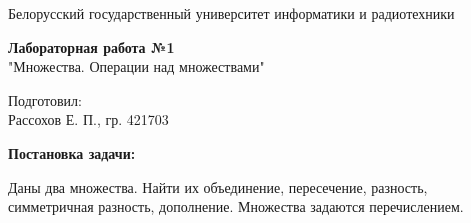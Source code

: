 \documentclass[]{article}
\begin{document}
	\begin{center}
		\par Белорусский государственный университет информатики и радиотехники
	\end{center}
	\vspace*{10cm}
	\begin{center}
		\huge
		\par \textbf{Лабораторная работа №1}\\
		\vspace{0.5cm}
		\normalsize 
		"Множества. Операции над множествами"
	\end{center}
	\vspace*{8cm}
	\begin{flushright}
		\large
		Подготовил:\\
		Рассохов Е. П., гр. 421703
	\end{flushright}
	\newpage
	
	
	\large{\textbf{Постановка задачи:}}
	\par Даны два множества. Найти их объединение, пересечение, разность, симметричная разность, дополнение. Множества задаются перечислением.\\
	
\end{document}
